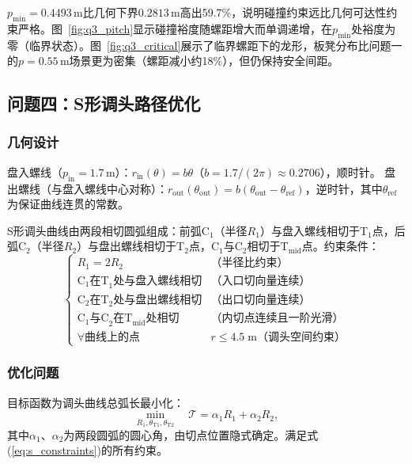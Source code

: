 \documentclass[12pt]{ctexart}
\begin{document}
$p_{\min}=0.4493$\,m比几何下界$0.2813$\,m高出59.7\%，说明碰撞约束远比几何可达性约束严格。图~\ref{fig:q3_pitch}显示碰撞裕度随螺距增大而单调递增，在$p_{\min}$处裕度为零（临界状态）。图~\ref{fig:q3_critical}展示了临界螺距下的龙形，板凳分布比问题一的$p=0.55$\,m场景更为密集（螺距减小约18\%），但仍保持安全间距。

\FloatBarrier

\subsection{问题四：S形调头路径优化}

\subsubsection{几何设计}

盘入螺线（$p_{\text{in}}=1.7$\,m）：$r_{\text{in}}(\theta)=b\theta$（$b=1.7/(2\pi)\approx 0.2706$），顺时针。
盘出螺线（与盘入螺线中心对称）：$r_{\text{out}}(\theta_{\text{out}})=b(\theta_{\text{out}}-\theta_{\text{ref}})$，逆时针，其中$\theta_{\text{ref}}$为保证曲线连贯的常数。

S形调头曲线由两段相切圆弧组成：前弧C$_1$（半径$R_1$）与盘入螺线相切于T$_1$点，后弧C$_2$（半径$R_2$）与盘出螺线相切于T$_2$点，C$_1$与C$_2$相切于T$_{\text{mid}}$点。约束条件：
\begin{equation}
\begin{cases}
R_1 = 2R_2 & \text{（半径比约束）}\\
\text{C}_1 \text{在T}_1\text{处与盘入螺线相切} & \text{（入口切向量连续）}\\
\text{C}_2 \text{在T}_2\text{处与盘出螺线相切} & \text{（出口切向量连续）}\\
\text{C}_1 \text{与C}_2 \text{在T}_{\text{mid}}\text{处相切} & \text{（内切点连续且一阶光滑）}\\
\forall \text{曲线上的点} & r \le 4.5\;\text{m（调头空间约束）}
\end{cases}
\label{eq:s_constraints}
\end{equation}

\subsubsection{优化问题}

目标函数为调头曲线总弧长最小化：
\begin{equation}
\min_{R_1,\theta_{\text{T1}},\theta_{\text{T2}}} \quad \mathcal{T} = \alpha_1 R_1 + \alpha_2 R_2,
\label{eq:s_opt}
\end{equation}
其中$\alpha_1$、$\alpha_2$为两段圆弧的圆心角，由切点位置隐式确定。满足式(\ref{eq:s_constraints})的所有约束。
\end{document}
